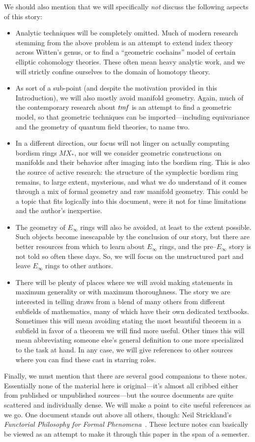 We should also mention that we will specifically \emph{not} discuss the following aspects of this story:
\begin{itemize}
\item Analytic techniques will be completely omitted.  Much of modern research stemming from the above problem is an attempt to extend index theory across Witten's genus, or to find a ``geometric cochains'' model of certain elliptic cohomology theories.  These often mean heavy analytic work, and we will strictly confine ourselves to the domain of homotopy theory.
\item As sort of a sub-point (and despite the motivation provided in this Introduction), we will also mostly avoid manifold geometry.  Again, much of the contemporary research about $\mathit{tmf}$ is an attempt to find a geometric model, so that geometric techniques can be imported---including equivariance and the geometry of quantum field theories, to name two.
\item In a different direction, our focus will not linger on actually computing bordism rings $MX_*$, nor will we consider geometric constructions on manifolds and their behavior after imaging into the bordism ring.  This is also the source of active research: the structure of the symplectic bordism ring remains, to large extent, mysterious, and what we do understand of it comes through a mix of formal geometry and raw manifold geometry.  This could be a topic that fits logically into this document, were it not for time limitations and the author's inexpertise.
\item The geometry of $E_\infty$ rings will also be avoided, at least to the extent possible.  Such objects become inescapable by the conclusion of our story, but there are better resources from which to learn about $E_\infty$ rings, and the pre--$E_\infty$ story is not told so often these days.  So, we will focus on the unstructured part and leave $E_\infty$ rings to other authors.
\item There will be plenty of places where we will avoid making statements in maximum generality or with maximum thoroughness.  The story we are interested in telling draws from a blend of many others from different subfields of mathematics, many of which have their own dedicated textbooks.  Sometimes this will mean avoiding stating the most beautiful theorem in a subfield in favor of a theorem we will find more useful.  Other times this will mean abbreviating someone else's general definition to one more specialized to the task at hand.  In any case, we will give references to other sources where you can find these cast in starring roles.
\end{itemize}

Finally, we must mention that there are several good companions to these notes.  Essentially none of the material here is original---it's almost all cribbed either from published or unpublished sources---but the source documents are quite scattered and individually dense.  We will make a point to cite useful references as we go.  One document stands out above all others, though: Neil Strickland's \textit{Functorial Philosophy for Formal Phenomena}~\cite{StricklandFPFP}.  These lecture notes can basically be viewed as an attempt to make it through this paper in the span of a semester.
